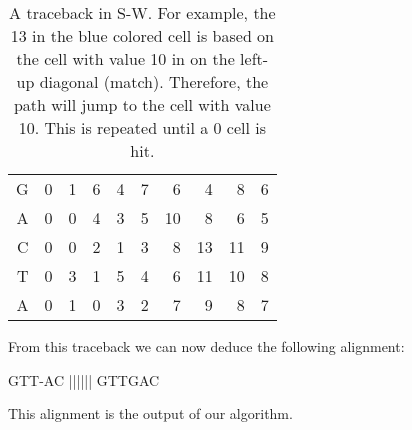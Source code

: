 \begin{enumerate}
\begin{table}[H]
\begin{tabular}{rrrrrrrrrr}
			\multicolumn{1}{r|}{G} & \multicolumn{1}{r|}{0} & \multicolumn{1}{r|}{1}                         & \multicolumn{1}{r|}{6}                         & \multicolumn{1}{r|}{4}                         & \multicolumn{1}{r|}{\cellcolor[HTML]{DAE8FC}7} & \multicolumn{1}{r|}{6}                          & \multicolumn{1}{r|}{4}                          & \multicolumn{1}{r|}{8}  & \multicolumn{1}{r|}{6} \\ \cline{2-10} 
			\multicolumn{1}{r|}{A} & \multicolumn{1}{r|}{0} & \multicolumn{1}{r|}{0}                         & \multicolumn{1}{r|}{4}                         & \multicolumn{1}{r|}{3}                         & \multicolumn{1}{r|}{5}                         & \multicolumn{1}{r|}{\cellcolor[HTML]{DAE8FC}10} & \multicolumn{1}{r|}{8}                          & \multicolumn{1}{r|}{6}  & \multicolumn{1}{r|}{5} \\ \cline{2-10} 
			\multicolumn{1}{r|}{C} & \multicolumn{1}{r|}{0} & \multicolumn{1}{r|}{0}                         & \multicolumn{1}{r|}{2}                         & \multicolumn{1}{r|}{1}                         & \multicolumn{1}{r|}{3}                         & \multicolumn{1}{r|}{8}                          & \multicolumn{1}{r|}{\cellcolor[HTML]{34CDF9}13} & \multicolumn{1}{r|}{11} & \multicolumn{1}{r|}{9} \\ \cline{2-10} 
			\multicolumn{1}{r|}{T} & \multicolumn{1}{r|}{0} & \multicolumn{1}{r|}{3}                         & \multicolumn{1}{r|}{1}                         & \multicolumn{1}{r|}{5}                         & \multicolumn{1}{r|}{4}                         & \multicolumn{1}{r|}{6}                          & \multicolumn{1}{r|}{11}                         & \multicolumn{1}{r|}{10} & \multicolumn{1}{r|}{8} \\ \cline{2-10} 
			\multicolumn{1}{r|}{A} & \multicolumn{1}{r|}{0} & \multicolumn{1}{r|}{1}                         & \multicolumn{1}{r|}{0}                         & \multicolumn{1}{r|}{3}                         & \multicolumn{1}{r|}{2}                         & \multicolumn{1}{r|}{7}                          & \multicolumn{1}{r|}{9}                          & \multicolumn{1}{r|}{8}  & \multicolumn{1}{r|}{7} \\ \cline{2-10} 
		\end{tabular}
		\caption{\centering A traceback in S-W. For example, the 13 in the blue colored cell is based on the cell with value 10 in on the left-up diagonal (match). Therefore, the path will jump to the cell with value 10. This is repeated until a 0 cell is hit.}
	\end{table}
	
	From this traceback we can now deduce the following alignment:
	
\begin{lcverbatim}
GTT-AC
||||||
GTTGAC
\end{lcverbatim}
	
	This alignment is the output of our algorithm.
	
\end{enumerate}

